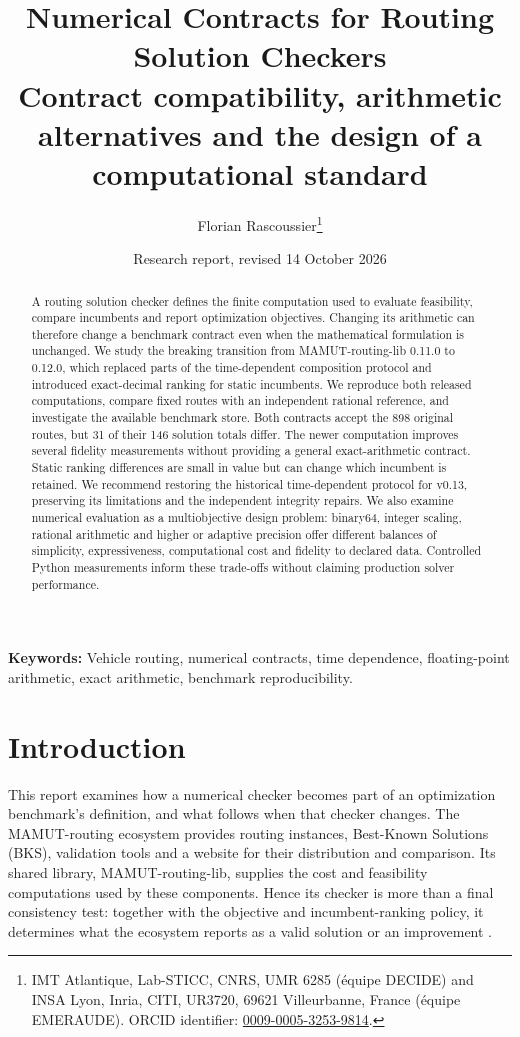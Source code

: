 \documentclass[11pt]{article}
\title{Numerical Contracts for Routing Solution Checkers\\[0.8ex]\large Contract compatibility, arithmetic alternatives and the design of a computational standard}
\author{Florian Rascoussier\thanks{IMT Atlantique, Lab-STICC, CNRS, UMR 6285 (équipe DECIDE) and INSA Lyon, Inria, CITI, UR3720, 69621 Villeurbanne, France (équipe EMERAUDE). ORCID identifier: \href{https://orcid.org/0009-0005-3253-9814}{0009-0005-3253-9814}.}}
\date{Research report, revised 14 October 2026}
\begin{document}
\maketitle

\begin{abstract}
A routing solution checker defines the finite computation used to evaluate feasibility, compare incumbents and report optimization objectives. Changing its arithmetic can therefore change a benchmark contract even when the mathematical formulation is unchanged. We study the breaking transition from MAMUT-routing-lib 0.11.0 to 0.12.0, which replaced parts of the time-dependent composition protocol and introduced exact-decimal ranking for static incumbents. We reproduce both released computations, compare fixed routes with an independent rational reference, and investigate the available benchmark store. Both contracts accept the 898 original routes, but 31 of their 146 solution totals differ. The newer computation improves several fidelity measurements without providing a general exact-arithmetic contract. Static ranking differences are small in value but can change which incumbent is retained. We recommend restoring the historical time-dependent protocol for v0.13, preserving its limitations and the independent integrity repairs. We also examine numerical evaluation as a multiobjective design problem: binary64, integer scaling, rational arithmetic and higher or adaptive precision offer different balances of simplicity, expressiveness, computational cost and fidelity to declared data. Controlled Python measurements inform these trade-offs without claiming production solver performance.
\end{abstract}

\noindent\textbf{Keywords:} Vehicle routing, numerical contracts, time dependence, floating-point arithmetic, exact arithmetic, benchmark reproducibility.

\tableofcontents
\clearpage

\section{Introduction}\label{sec:introduction}

This report examines how a numerical checker becomes part of an optimization benchmark's definition, and what follows when that checker changes. The MAMUT-routing ecosystem provides routing instances, Best-Known Solutions (BKS), validation tools and a website for their distribution and comparison. Its shared library, MAMUT-routing-lib, supplies the cost and feasibility computations used by these components. Hence its checker is more than a final consistency test: together with the objective and incumbent-ranking policy, it determines what the ecosystem reports as a valid solution or an improvement \autocite{mamutRoutingPlatform2026,mamutChecker0112026,mamutChecker0122026}.
\end{document}
